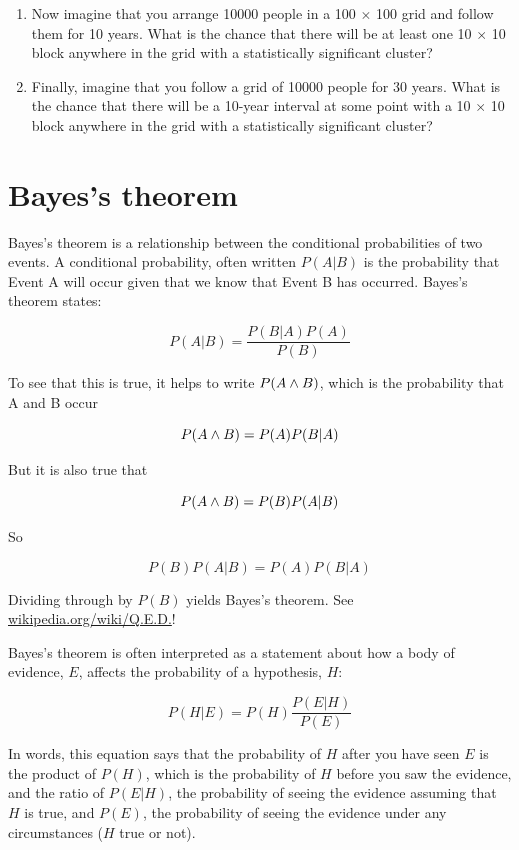 \documentclass[12pt]{book}
\begin{document}
\begin{ex}
\begin{enumerate}
\item Now imagine that you arrange 10000 people in a 100 $\times$ 100
  grid and follow them for 10 years.  What is the chance that there
  will be at least one 10 $\times$ 10 block anywhere in the grid
  with a statistically significant cluster?

\item Finally, imagine that you follow a grid of 10000 people for 30
  years.  What is the chance that there will be a 10-year interval
  at some point with a 10 $\times$ 10 block anywhere in the grid
  with a statistically significant cluster?

\end{enumerate}

\end{ex}



\section{Bayes's theorem}

Bayes's theorem is a relationship between the conditional probabilities
of two events.  A conditional probability, often written $P(A|B)$ is
the probability that Event A will occur given that we know that
Event B has occurred.  Bayes's theorem states:

\[ P(A|B) = \frac{P(B|A)P(A)}{P(B)} \]

To see that this is true, it helps to write $P(A \wedge B)$, which
is the probability that A and B occur

\[ P(A \wedge B) = P(A) P(B|A) \]

But it is also true that 
 
\[ P(A \wedge B) = P(B) P(A|B) \]

So

\[ P(B) P(A|B) = P(A) P(B|A) \]

Dividing through by $P(B)$ yields Bayes's theorem.
See \url{wikipedia.org/wiki/Q.E.D.}!

Bayes's theorem is often interpreted as a statement about 
how a body of evidence, $E$, affects the probability of a 
hypothesis, $H$:

\[ P(H|E) = P(H) \frac{P(E|H)}{P(E)} \]

In words, this equation says that the probability of $H$ after you
have seen $E$ is the product of $P(H)$, which is the probability of
$H$ before you saw the evidence, and the ratio of $P(E|H)$, the
probability of seeing the evidence assuming that $H$ is true, and
$P(E)$, the probability of seeing the evidence under any circumstances
($H$ true or not).
\end{document}
